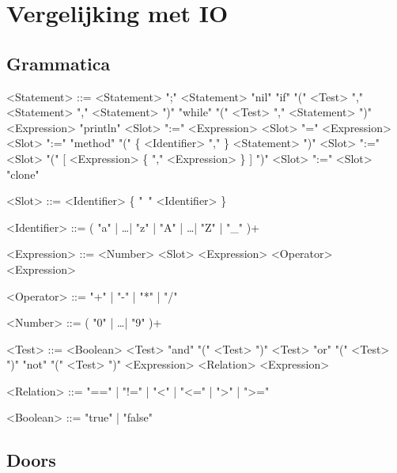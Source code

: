 \chapter{Vergelijking met IO}

\section{Grammatica}

\begin{grammar}
<Statement>  ::= <Statement> ";" <Statement>
            \alt "nil"
            \alt "if" "(" <Test> "," <Statement> "," <Statement> ")"
            \alt "while" "(" <Test> "," <Statement> ")"
            \alt <Expression> "println"
            \alt <Slot> ":=" <Expression>
            \alt <Slot>  "=" <Expression>
            \alt <Slot> ":=" "method" "(" \{ <Identifier> "," \} <Statement> ")"
            \alt <Slot> ":=" <Slot> "(" [ <Expression> \{ "," <Expression> \} ] ")"
            \alt <Slot> ":=" <Slot> "clone"

<Slot>       ::= <Identifier> \{ "\ " <Identifier> \}

<Identifier> ::= ( "a" | \dots | "z" | "A" | \dots | "Z" | "_" )+

<Expression> ::= <Number>
            \alt <Slot>
            \alt <Expression> <Operator> <Expression>

<Operator>   ::= "+" | "-" | "*" | "/"

<Number>     ::= ( "0" | \dots | "9" )+

<Test>       ::= <Boolean>
            \alt <Test> "and" "(" <Test> ")"
            \alt <Test> "or" "(" <Test> ")"
            \alt "not" "(" <Test> ")"
            \alt <Expression> <Relation> <Expression>

<Relation>   ::= "==" | "!=" | "<" | "<=" | ">" | ">="

<Boolean>    ::= "true" | "false"
\end{grammar}

\newpage
\section{Doors}

